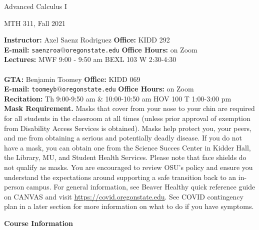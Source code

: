\documentclass{article}
\begin{document}
\begin{center}
\begin{Large}
Advanced Calculus I
\end{Large}

\begin{large}
MTH 311, Fall 2021
\end{large}
\end{center}

\bigskip

\noindent \textbf{Instructor:} Axel Saenz Rodriguez \hfill \textbf{Office:} KIDD 292\\
\noindent \textbf{E-mail:} \texttt{saenzroa$@$oregonstate.edu} \hfill \textbf{Office Hours:} on Zoom\\
\noindent \textbf{Lectures:} MWF 9:00 - 9:50 am BEXL 103  \hfill  W 2:30-4:30 \\
\vspace{1mm}\\
\noindent \textbf{GTA:} Benjamin Toomey \hfill \textbf{Office:} KIDD 069\\
\noindent \textbf{E-mail:} \texttt{toomeyb$@$oregonstate.edu} \hfill \textbf{Office Hours:} on Zoom \\
\noindent \textbf{Recitation:} Th 9:00-9:50 am \& 10:00-10:50 am HOV 100 \hfill T 1:00-3:00 pm\\

\noindent \textbf{Mask Requirement.} Masks that cover from your nose to your chin are required for all students in the classroom at all times (unless prior approval of exemption from Disability Access Services is obtained). Masks help protect you, your peers, and me from obtaining a serious and potentially deadly disease. If you do not have a mask, you can obtain one from the Science Succes Center in Kidder Hall, the Library, MU, and Student Health Services. Please note that face shields do not qualify as masks. You are encouraged to review OSU’s policy and ensure you understand the expectations around supporting a safe transition back to an in-person campus. For general information, see Beaver Healthy quick reference guide on CANVAS and visit \href{https://covid.oregonstate.edu}{https://covid.oregonstate.edu}. See COVID contingency plan in a later section for more information on what to do if you have symptoms.

\bigskip

\begin{large}
\noindent \textbf{Course Information}
\end{large}
\end{document}
